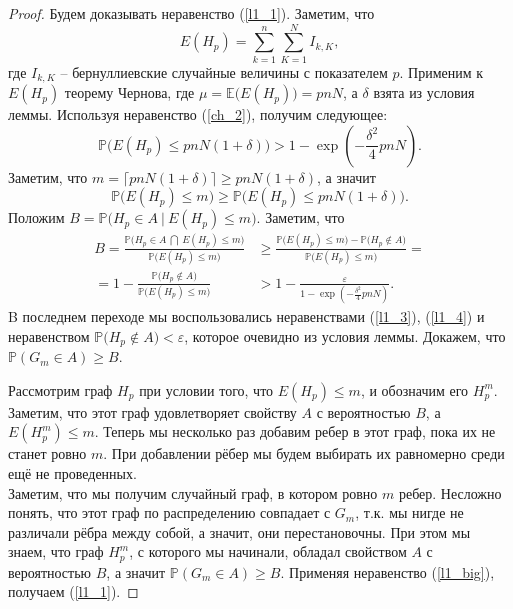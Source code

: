 \documentclass{matmex-diploma-custom}
\newcommand{\Expect}{\mathbb E}
\newcommand{\PRob}{\mathbb P}
\newcommand{\leqs}{\leqslant}
\newcommand{\geqs}{\geqslant}
\newcommand{\eps}{\varepsilon}
\theoremstyle{named}
\begin{document}
\begin{proof}
Будем доказывать неравенство (\ref{l1_1}). Заметим, что 
\begin{equation}
E(H_p) = \sum_{k=1}^n \sum_{K=1}^N I_{k, K},
\end{equation}
где $I_{k,K}$ -- бернуллиевские случайные величины с показателем $p$.
Применим к $E(H_p)$ теорему Чернова, где $\mu = \Expect\big(E(H_p)\big) = pnN$, а $\delta$ взята из условия леммы.
Используя неравенство (\ref{ch_2}), получим следующее:
\begin{equation}\label{l1_3}
\PRob\Big( E(H_p) \leqs pnN(1+\delta) \Big) > 1 - \exp\left(-\frac{\delta^2}{4}pnN\right).
\end{equation}
Заметим, что $m = \lceil pnN(1+\delta) \rceil \geqs pnN(1+\delta)$, а значит
\begin{equation}\label{l1_4}
\PRob\Big( E(H_p) \leqs m \Big) \geqs \PRob\Big( E(H_p) \leqs pnN(1+\delta) \Big).
\end{equation}
Положим $B = \PRob\Big( H_p \in A~\big|~E(H_p) \leqs m \Big)$. Заметим, что
\begin{equation}\label{l1_big}
\begin{aligned}
B = \frac{
		\PRob\Big( H_p \in A~\bigcap~E(H_p) \leqs m \Big)
	}{
		\PRob\big(E(H_p) \leqs m \big)
	} 
&\geqs 
	\frac{
		\PRob\big(E(H_p) \leqs m \big) 
			-
		\PRob\big(H_p \not\in A \big)
	}{
		\PRob\big(E(H_p) \leqs m\big)
	}
=
\\
=
	1 
		-
	\frac{
		\PRob\big(H_p \not\in A \big)
	}{
		\PRob\big(E(H_p) \leqs m\big)
	}
&>
	1
		-
	\frac{\eps}{
		1 - \exp\left(-\frac{\delta^2}{4}pnN\right)
	}.
\end{aligned}\end{equation}
B последнем переходе мы воспользовались неравенствами (\ref{l1_3}), (\ref{l1_4}) 
и неравенством $\PRob\big(H_p \not\in A \big) < \eps$, которое очевидно из условия леммы.
Докажем, что $\PRob(G_m \in A) \geqs B$.

Рассмотрим граф $H_p$ при условии того, что $E(H_p) \leqs m$, и обозначим его $H_p^m$. 
Заметим, что этот граф удовлетворяет свойству $A$ с вероятностью $B$, а $E(H_p^m) \leqs m$.
Теперь мы несколько раз добавим ребер в этот граф, пока их не станет ровно $m$. 
При добавлении рёбер мы будем выбирать их равномерно среди ещё не проведенных.
\\
Заметим, что мы получим случайный граф, в котором ровно $m$ ребер. Несложно понять, 
что этот граф по распределению совпадает с $G_m$, т.к. мы нигде не различали рёбра между собой, а значит, они перестановочны.
При этом мы знаем, что граф $H_p^m$, с которого мы начинали, обладал свойством $A$ с вероятностью $B$, 
а значит $\PRob(G_m \in A) \geqs B$. Применяя неравенство (\ref{l1_big}), получаем (\ref{l1_1}).


\end{proof}
\end{document}

